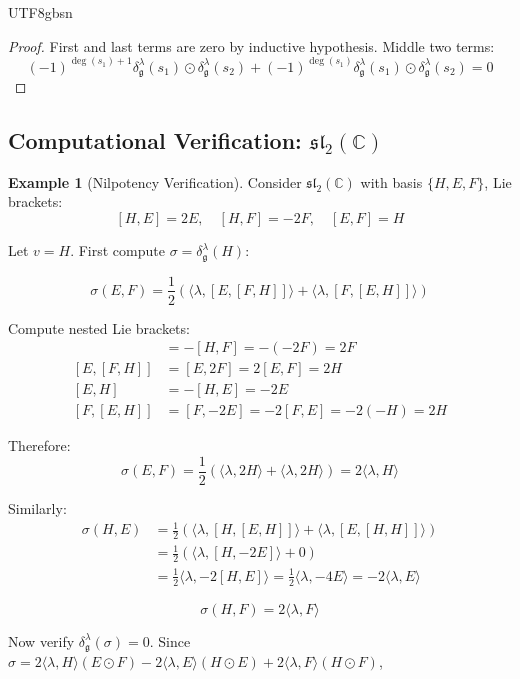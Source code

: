 \documentclass[a4paper,12pt]{extarticle}
\theoremstyle{definition}
\newtheorem{example}{Example}[section]
\begin{document}
\begin{CJK}{UTF8}{gbsn}
\begin{proof}
First and last terms are zero by inductive hypothesis. Middle two terms:
$$(-1)^{\deg(s_1)+1} \delta^\lambda_\mathfrak{g}(s_1) \odot \delta^\lambda_\mathfrak{g}(s_2) + (-1)^{\deg(s_1)} \delta^\lambda_\mathfrak{g}(s_1) \odot \delta^\lambda_\mathfrak{g}(s_2) = 0$$
\end{proof}

\subsection{Computational Verification: $\mathfrak{sl}_2(\mathbb{C})$}
\label{subsec:sl2_verification}

\begin{example}[Nilpotency Verification]
\label{ex:sl2_nilpotency_verification}
Consider $\mathfrak{sl}_2(\mathbb{C})$ with basis $\{H, E, F\}$, Lie brackets:
$$[H, E] = 2E, \quad [H, F] = -2F, \quad [E, F] = H$$

Let $v = H$. First compute $\sigma = \delta^\lambda_\mathfrak{g}(H)$:

$$\sigma(E, F) = \frac{1}{2} \left( \langle \lambda, [E, [F, H]] \rangle + \langle \lambda, [F, [E, H]] \rangle \right)$$

Compute nested Lie brackets:
\begin{align}
[F, H] &= -[H, F] = -(-2F) = 2F \\
[E, [F, H]] &= [E, 2F] = 2[E, F] = 2H \\
[E, H] &= -[H, E] = -2E \\
[F, [E, H]] &= [F, -2E] = -2[F, E] = -2(-H) = 2H
\end{align}

Therefore:
$$\sigma(E, F) = \frac{1}{2} \left( \langle \lambda, 2H \rangle + \langle \lambda, 2H \rangle \right) = 2\langle \lambda, H \rangle$$

Similarly:
\begin{align}
\sigma(H, E) &= \frac{1}{2} \left( \langle \lambda, [H, [E, H]] \rangle + \langle \lambda, [E, [H, H]] \rangle \right) \\
&= \frac{1}{2} \left( \langle \lambda, [H, -2E] \rangle + 0 \right) \\
&= \frac{1}{2} \langle \lambda, -2[H, E] \rangle = \frac{1}{2} \langle \lambda, -4E \rangle = -2\langle \lambda, E \rangle
\end{align}

$$\sigma(H, F) = 2\langle \lambda, F \rangle$$

Now verify $\delta^\lambda_\mathfrak{g}(\sigma) = 0$. Since $\sigma = 2\langle \lambda, H \rangle (E \odot F) - 2\langle \lambda, E \rangle (H \odot E) + 2\langle \lambda, F \rangle (H \odot F)$,


\end{example}
\end{CJK}
\end{document}
